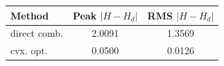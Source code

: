 \begin{tabular}{lcc}
  \toprule
  Method & Peak $|H - H_d|$ & RMS $|H - H_d|$ \\
  \midrule
  direct comb. & 2.0091 & 1.3569 \\
  cvx. opt.    & 0.0500 & 0.0126 \\
  \bottomrule
\end{tabular}
